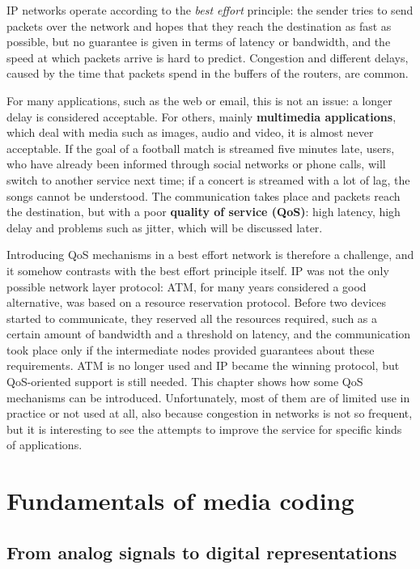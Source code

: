 \documentclass[11pt,a4paper,openany]{report}
\begin{document}
IP networks operate according to the \emph{best effort} principle: the sender tries to send packets over the network and hopes that they reach the destination as fast as possible, but no guarantee is given in terms of latency or bandwidth, and the speed at which packets arrive is hard to predict. Congestion and different delays, caused by the time that packets spend in the buffers of the routers, are common.

For many applications, such as the web or email, this is not an issue: a longer delay is considered acceptable. For others, mainly \textbf{multimedia applications}, which deal with media such as images, audio and video, it is almost never acceptable. If the goal of a football match is streamed five minutes late, users, who have already been informed through social networks or phone calls, will switch to another service next time; if a concert is streamed with a lot of lag, the songs cannot be understood. The communication takes place and packets reach the destination, but with a poor \textbf{quality of service (QoS)}: high latency, high delay and problems such as jitter, which will be discussed later.

Introducing QoS mechanisms in a best effort network is therefore a challenge, and it somehow contrasts with the best effort principle itself. IP was not the only possible network layer protocol: ATM, for many years considered a good alternative, was based on a resource reservation protocol. Before two devices started to communicate, they reserved all the resources required, such as a certain amount of bandwidth and a threshold on latency, and the communication took place only if the intermediate nodes provided guarantees about these requirements. ATM is no longer used and IP became the winning protocol, but QoS-oriented support is still needed. This chapter shows how some QoS mechanisms can be introduced. Unfortunately, most of them are of limited use in practice or not used at all, also because congestion in networks is not so frequent, but it is interesting to see the attempts to improve the service for specific kinds of applications.

\section{Fundamentals of media coding}

\subsection{From analog signals to digital representations}
\end{document}
